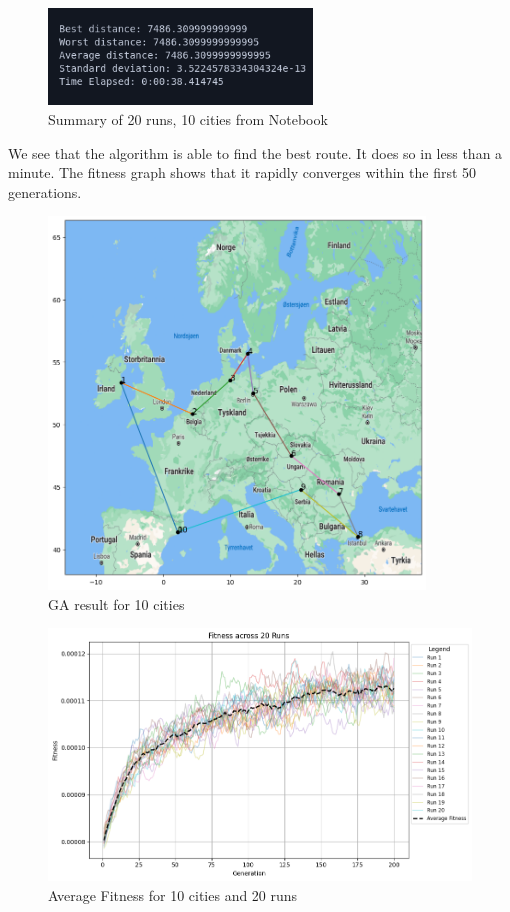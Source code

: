 \documentclass{article}
\begin{document}
    \begin{figure}[ht!]
        \includegraphics[width=7cm]{images/ga_10_cities_summary.png}
        \centering
        \caption{Summary of 20 runs, 10 cities from Notebook}
    \end{figure}

    We see that the algorithm is able to find the best route. It does so in less than a minute.
    The fitness graph shows that it rapidly converges within the first 50 generations.

    \begin{figure}[ht!]
        \includegraphics[width=10cm]{images/ga_10_cities.png}
        \centering
        \caption{GA result for 10 cities}
    \end{figure}

    \begin{figure}[ht!]
        \includegraphics[width=12cm]{images/ga_10_cities_avg_graph.png}
        \centering
        \caption{Average Fitness for 10 cities and 20 runs}
    \end{figure}
\end{document}
